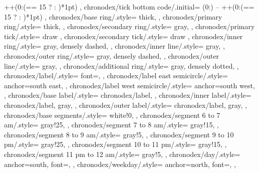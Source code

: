 {{        ++(0:{(\n == 15 ?  : )*1pt})
    },
    chronodex/tick bottom code/.initial={
        (0:) --
        ++(0:{(\n == 15 ?  : )*1pt})
    },
    chronodex/base ring/.style={
        thick,
    },
    chronodex/primary ring/.style={
        thick,
    },
    chronodex/secondary ring/.style={
        gray,
    },
    chronodex/primary tick/.style={
        draw
    },
    chronodex/secondary tick/.style={
        draw
    },
    chronodex/inner ring/.style={
        gray,
        densely dashed,
    },
    chronodex/inner line/.style={
        gray,
    },
    chronodex/outer ring/.style={
        gray,
        densely dashed,
    },
    chronodex/outer line/.style={
        gray,
    },
    chronodex/additional ring/.style={
        gray,
        densely dotted,
    },
    chronodex/label/.style={
        font=\footnotesize,
    },
    chronodex/label east semicircle/.style={
        anchor=south east,
    },
    chronodex/label west semicircle/.style={
        anchor=south west,
    },
    chronodex/base label/.style={
        chronodex/label,
    },
    chronodex/inner label/.style={
        chronodex/label,
        gray,
    },
    chronodex/outer label/.style={
        chronodex/label,
        gray,
    },
    chronodex/base segments/.style={
        white!0,
    },
    chronodex/segment 6 to 7 am/.style={
        gray!25,
    },
    chronodex/segment 7 to 8 am/.style={
        gray!15,
    },
    chronodex/segment 8 to 9 am/.style={
        gray!5,
    },
    chronodex/segment 9 to 10 pm/.style={
        gray!25,
    },
    chronodex/segment 10 to 11 pm/.style={
        gray!15,
    },
    chronodex/segment 11 pm to 12 am/.style={
        gray!5,
    },
    chronodex/day/.style={
        anchor=south,
        font=\Huge,
    },
    chronodex/weekday/.style={
        anchor=north,
        font=\large,
    },
}%